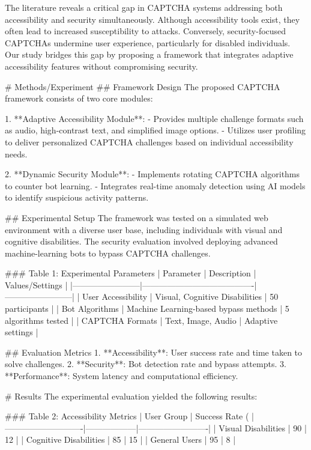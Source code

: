 The literature reveals a critical gap in CAPTCHA systems addressing both accessibility and security simultaneously. Although accessibility tools exist, they often lead to increased susceptibility to attacks. Conversely, security-focused CAPTCHAs undermine user experience, particularly for disabled individuals. Our study bridges this gap by proposing a framework that integrates adaptive accessibility features without compromising security.  

# Methods/Experiment  
## Framework Design  
The proposed CAPTCHA framework consists of two core modules:  

1. **Adaptive Accessibility Module**:  
   - Provides multiple challenge formats such as audio, high-contrast text, and simplified image options.  
   - Utilizes user profiling to deliver personalized CAPTCHA challenges based on individual accessibility needs.  

2. **Dynamic Security Module**:  
   - Implements rotating CAPTCHA algorithms to counter bot learning.  
   - Integrates real-time anomaly detection using AI models to identify suspicious activity patterns.  

## Experimental Setup  
The framework was tested on a simulated web environment with a diverse user base, including individuals with visual and cognitive disabilities. The security evaluation involved deploying advanced machine-learning bots to bypass CAPTCHA challenges.  

### Table 1: Experimental Parameters  
| Parameter              | Description                            | Values/Settings        |  
|------------------------|----------------------------------------|------------------------|  
| User Accessibility     | Visual, Cognitive Disabilities        | 50 participants        |  
| Bot Algorithms         | Machine Learning-based bypass methods | 5 algorithms tested    |  
| CAPTCHA Formats        | Text, Image, Audio                    | Adaptive settings      |  

## Evaluation Metrics  
1. **Accessibility**: User success rate and time taken to solve challenges.  
2. **Security**: Bot detection rate and bypass attempts.  
3. **Performance**: System latency and computational efficiency.  

# Results  
The experimental evaluation yielded the following results:  

### Table 2: Accessibility Metrics  
| User Group                 | Success Rate (%
|----------------------------|------------------|-------------------------|  
| Visual Disabilities        | 90               | 12                      |  
| Cognitive Disabilities     | 85               | 15                      |  
| General Users              | 95               | 8                       |  

